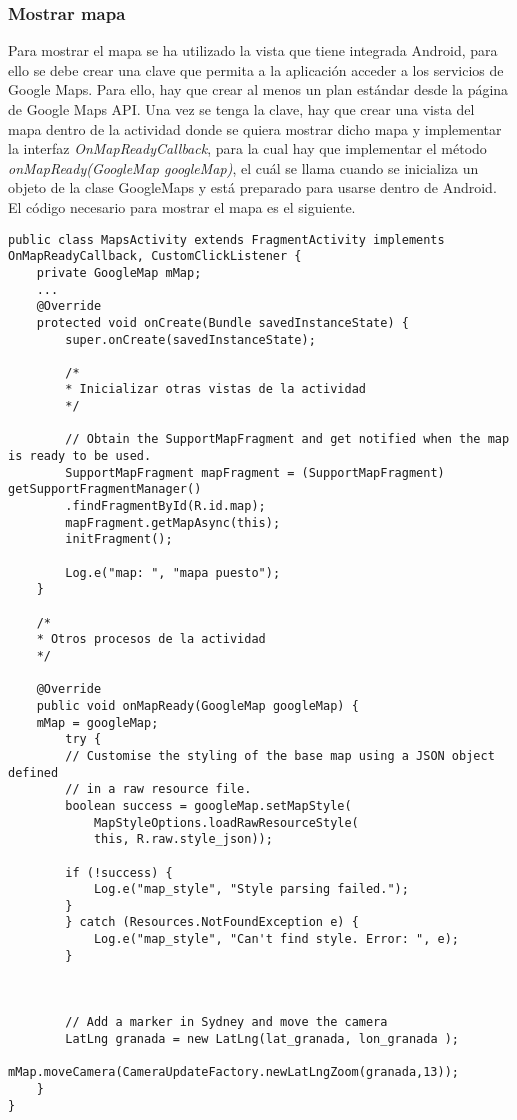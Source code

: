 \subsubsection{Mostrar mapa}
Para mostrar el mapa se ha utilizado la vista que tiene integrada Android, para ello se debe crear una clave que  permita a la aplicación acceder a los servicios de Google Maps. Para ello, hay que crear al menos un plan estándar desde la página de Google Maps API. Una vez se tenga la clave, hay que crear una vista del mapa dentro de la actividad donde se quiera mostrar dicho mapa y implementar la interfaz \textit{OnMapReadyCallback}, para la cual hay que implementar el método \textit{onMapReady(GoogleMap googleMap)}, el cuál se llama cuando se inicializa un objeto de la clase GoogleMaps y está preparado para usarse dentro de Android. El código necesario para mostrar el mapa es el siguiente.
\newpage
\begin{lstlisting}[caption=código necesario para mostrar el mapa en la aplicación]
public class MapsActivity extends FragmentActivity implements OnMapReadyCallback, CustomClickListener {
	private GoogleMap mMap;
	...
	@Override
	protected void onCreate(Bundle savedInstanceState) {
		super.onCreate(savedInstanceState);
		
		/*
		* Inicializar otras vistas de la actividad
		*/
		
		// Obtain the SupportMapFragment and get notified when the map is ready to be used.
		SupportMapFragment mapFragment = (SupportMapFragment) getSupportFragmentManager()
		.findFragmentById(R.id.map);
		mapFragment.getMapAsync(this);
		initFragment();
		
		Log.e("map: ", "mapa puesto");
	}
	
	/*
	* Otros procesos de la actividad
	*/
	
	@Override
	public void onMapReady(GoogleMap googleMap) {
	mMap = googleMap;
		try {
		// Customise the styling of the base map using a JSON object defined
		// in a raw resource file.
		boolean success = googleMap.setMapStyle(
			MapStyleOptions.loadRawResourceStyle(
			this, R.raw.style_json));
		
		if (!success) {
			Log.e("map_style", "Style parsing failed.");
		}
		} catch (Resources.NotFoundException e) {
			Log.e("map_style", "Can't find style. Error: ", e);
		}
		
		
		
		// Add a marker in Sydney and move the camera
		LatLng granada = new LatLng(lat_granada, lon_granada );
		mMap.moveCamera(CameraUpdateFactory.newLatLngZoom(granada,13));
	}
}
\end{lstlisting}
